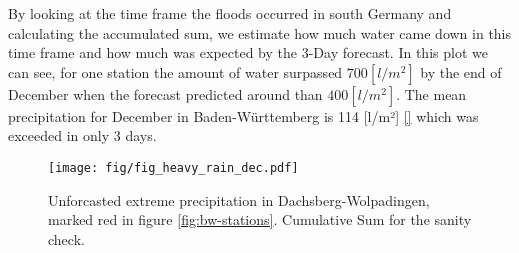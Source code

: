 \documentclass{article}
\theoremstyle{plain}
\theoremstyle{definition}
\theoremstyle{remark}
\begin{document}
By looking at the time frame the floods occurred in south Germany and
calculating the accumulated sum, we estimate how much water came down in this
time frame and how much was expected by the 3-Day forecast. In this plot we can
see, for one station the amount of water surpassed $700 [l/m^2]$ by the end of
December when the forecast predicted around than $400 [l/m^2]$. The mean
precipitation for December in Baden-Württemberg is 114 [l/m²] \ref{} which was
exceeded in only 3 days.

\begin{figure}[h]
    \centering
    \label{fig:cum_sum_heavy_rain}
    \texttt{[image: fig/fig\_heavy\_rain\_dec.pdf]}
    \caption{Unforcasted extreme precipitation in Dachsberg-Wolpadingen, marked red
        in figure \ref{fig:bw-stations}. Cumulative Sum for the sanity check. }
\end{figure}
\end{document}
